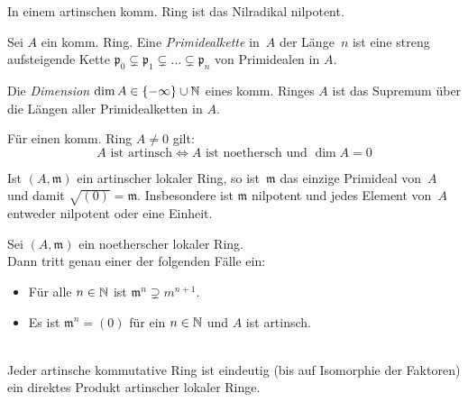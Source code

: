 \documentclass{cheat-sheet}
\newcommand{\ppp}{\mathfrak{p}}
\newcommand{\mmm}{\mathfrak{m}}
\begin{document}
\begin{prop}
  In einem artinschen komm. Ring ist das Nilradikal nilpotent.
\end{prop}


\begin{defn}
  Sei $A$ ein komm. Ring.
  Eine \emph{Primidealkette} in~$A$ der Länge~$n$ ist eine streng aufsteigende Kette $\ppp_0 \subsetneq \ppp_1 \subsetneq \ldots \subsetneq \ppp_n$ von Primidealen in $A$.
\end{defn}

\begin{defn}
  Die \emph{Dimension} $\dim A \in \{ - \infty \} \cup \mathbb{N}$ eines komm. Ringes $A$ ist das Supremum über die Längen aller Primidealketten in $A$.
\end{defn}

\begin{bspe}
   \quad
   \quad
\end{bspe}

\begin{satz}
  Für einen komm. Ring $A \neq 0$ gilt:
  \[
    \text{$A$ ist artinsch} \iff \text{$A$ ist noethersch und $\dim A = 0$}
  \]
\end{satz}

\begin{bem}
  Ist $(A, \mmm)$ ein artinscher lokaler Ring, so ist~$\mmm$ das einzige Primideal von~$A$ und damit $\sqrt{(0)} = \mmm$.
  Insbesondere ist $\mmm$ nilpotent und jedes Element von~$A$ entweder nilpotent oder eine Einheit.
\end{bem}

\begin{prop}
  Sei $(A, \mmm)$ ein noetherscher lokaler Ring. \\
  Dann tritt genau einer der folgenden Fälle ein:
  \begin{itemize}
    \item Für alle $n \in \mathbb{N}$ ist $\mmm^n \supsetneq m^{n+1}$.
    \item Es ist $\mmm^n = (0)$ für ein $n \in \mathbb{N}$ und $A$ ist artinsch.
  \end{itemize}
\end{prop}

\begin{satz} \mbox{} \\
  Jeder artinsche kommutative Ring ist eindeutig (bis auf Isomorphie der Faktoren) ein direktes Produkt artinscher lokaler Ringe.
\end{satz}
\end{document}
